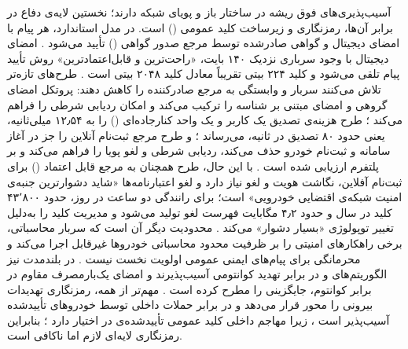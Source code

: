 آسیب‌پذیری‌های فوق ریشه در ساختار باز و پویای شبکه دارند؛ نخستین لایه‌ی دفاع در برابر آن‌ها، رمزنگاری و زیرساخت کلید عمومی () است. در مدل استاندارد، هر پیام با امضای دیجیتال و گواهی صادرشده توسط مرجع صدور گواهی () تأیید می‌شود \cite{SecuringVehicularAd}. امضای دیجیتال با وجود سرباری نزدیک ۱۴۰ بایت، «راحت‌ترین و قابل‌اعتمادترین» روش تأیید پیام تلقی می‌شود و کلید ۲۲۴ بیتی  تقریباً معادل کلید ۲۰۴۸ بیتی  است \cite{SecuringVehicularAd}. طرح‌های تازه‌تر تلاش می‌کنند سربار و وابستگی به مرجع صادرکننده را کاهش دهند: پروتکل  امضای گروهی و امضای مبتنی بر شناسه را ترکیب می‌کند و امکان ردیابی شرطی را فراهم می‌کند \cite{linGSISSecurePrivacyPreserving2007}؛ طرح  هزینه‌ی تصدیق یک کاربر و یک واحد کنارجاده‌ای () را به ۱۲٫۵۴ میلی‌ثانیه، یعنی حدود ۸۰ تصدیق در ثانیه، می‌رساند \cite{mariaBAIVEfficientBlockchainBased2022}؛ و طرح  مرجع ثبت‌نام آنلاین را جز در آغاز سامانه و ثبت‌نام خودرو حذف می‌کند، ردیابی شرطی و لغو پویا را فراهم می‌کند و بر پلتفرم  ارزیابی شده است \cite{fengBPASBlockchainAssistedPrivacyPreserving2020}. با این حال، طرح  همچنان به مرجع قابل اعتماد () برای ثبت‌نام آفلاین، نگاشت هویت و لغو نیاز دارد \cite{mariaBAIVEfficientBlockchainBased2022} و لغو اعتبارنامه‌ها «شاید دشوارترین جنبه‌ی امنیت شبکه‌ی اقتضایی خودرویی» است؛ برای رانندگی دو ساعت در روز، حدود ۴۳٬۸۰۰ کلید در سال و حدود ۴٫۲ مگابایت فهرست لغو تولید می‌شود \cite{SecuringVehicularAd} و مدیریت کلید را به‌دلیل تغییر توپولوژی «بسیار دشوار» می‌کند \cite{hozouriOverviewVANETVehicular2023}. محدودیت دیگر آن است که سربار محاسباتی، برخی راهکارهای امنیتی را بر ظرفیت محدود محاسباتی خودروها غیرقابل اجرا می‌کند \cite{farsimadanReviewSecurityChallenges2025} و محرمانگی برای پیام‌های ایمنی عمومی  اولویت نخست نیست \cite{farsimadanReviewSecurityChallenges2025, SecuringVehicularAd}. در بلندمدت نیز الگوریتم‌های  و  در برابر تهدید کوانتومی آسیب‌پذیرند و امضای یک‌بارمصرف مقاوم در برابر کوانتوم، جایگزینی را مطرح کرده است \cite{sealeyIOTATangle202022}. مهم‌تر از همه، رمزنگاری تهدیدات بیرونی را محور قرار می‌دهد و در برابر حملات داخلی توسط خودروهای تأییدشده آسیب‌پذیر است \cite{farsimadanReviewSecurityChallenges2025}، زیرا مهاجم داخلی کلید عمومی تأییدشده‌ی در اختیار دارد \cite{SecuringVehicularAd}؛ بنابراین رمزنگاری لایه‌ای لازم اما ناکافی است.

